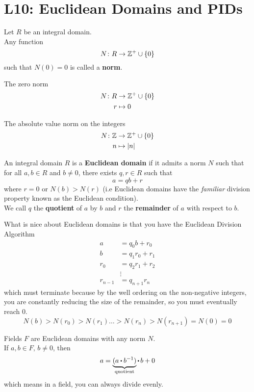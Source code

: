 \documentclass[../Main.tex]{subfiles}
\begin{document}
\chapter{L10: Euclidean Domains and PIDs}
\begin{dfn}[title = Norm]
	Let $R$ be an integral domain.\\
	Any function
	\[N\colon R\to \mathbb{Z}^+\cup \{0\}\]
	such that $N(0)=0$ is called a \textbf{norm}.
\end{dfn}
\begin{example}
	The zero norm
	\begin{align*}
		N\colon R&\to \mathbb{Z}^+\cup \{0\} \\
		r&\mapsto 0
	\end{align*}
\end{example}
\begin{example}
	The absolute value norm on the integers
	\begin{align*}
	N\colon \mathbb{Z}&\to \mathbb{Z}^+\cup \{0\} \\
	n&\mapsto |n|
	\end{align*}
\end{example}
\begin{dfn}[title = {Euclidean Domain, Quotient, Remainder}]
	An integral domain $R$ is a \textbf{Euclidean domain} if it admits a norm $N$ such that for all $a,b\in R$ and $b\ne 0$, there exists $q,r\in R$ such that
	\[a=qb+r\]
	where $r=0$ or $N(b)>N(r)$ (i.e Euclidean domains have the \textit{familiar} division property known as the Euclidean condition).\\
	We call $q$ the \textbf{quotient} of $a$ by $b$ and $r$ the \textbf{remainder} of $a$ with respect to $b$.
\end{dfn}
What is nice about Euclidean domains is that you have the Euclidean Division Algorithm
\begin{align*}
a&=q_0b+r_0\\
b&=q_1r_0+r_1\\
r_0&=q_2r_1+r_2\\
&\vdots\\
r_{n-1}&=q_{n+1}r_n
\end{align*}
which must terminate because by the well ordering on the non-negative integers, you are constantly reducing the size of the remainder, so you must eventually reach $0$.
\[N(b)>N(r_0)>N(r_1)\dots >N(r_n)> N(r_{n+1})=N(0)=0 \]
\newpage
\begin{example}
	Fields $F$ are Euclidean domains with any norm $N$.\\
	If $a,b\in F, \, b\ne0$, then
	\[a=\underbrace{(a\rdot b^{-1})}_{\text{quotient}}\rdot\, b+ 0 \]
	which means in a field, you can always divide evenly.
\end{example}
\end{document}
